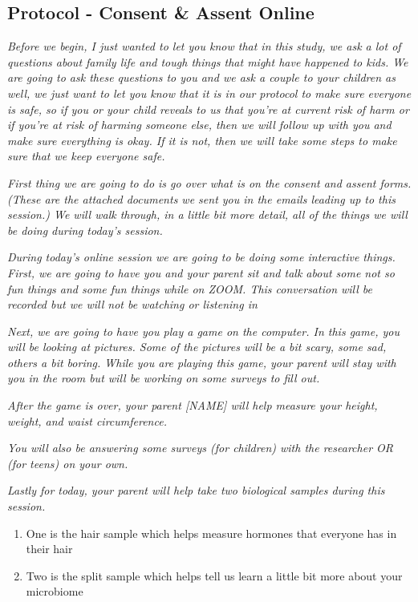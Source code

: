 \documentclass[]{book}
\begin{document}
\hypertarget{protocol---consent-assent-online-1}{%
\subsection{Protocol - Consent \& Assent Online}\label{protocol---consent-assent-online-1}}

\emph{Before we begin, I just wanted to let you know that in this study, we ask a lot of questions about family life and tough things that might have happened to kids. We are going to ask these questions to you and we ask a couple to your children as well, we just want to let you know that it is in our protocol to make sure everyone is safe, so if you or your child reveals to us that you're at current risk of harm or if you're at risk of harming someone else, then we will follow up with you and make sure everything is okay. If it is not, then we will take some steps to make sure that we keep everyone safe.}

\emph{First thing we are going to do is go over what is on the consent and assent forms. (These are the attached documents we sent you in the emails leading up to this session.) We will walk through, in a little bit more detail, all of the things we will be doing during today's session.}

\emph{During today's online session we are going to be doing some interactive things. First, we are going to have you and your parent sit and talk about some not so fun things and some fun things while on ZOOM. This conversation will be recorded but we will not be watching or listening in}

\emph{Next, we are going to have you play a game on the computer. In this game, you will be looking at pictures. Some of the pictures will be a bit scary, some sad, others a bit boring. While you are playing this game, your parent will stay with you in the room but will be working on some surveys to fill out.}

\emph{After the game is over, your parent {[}NAME{]} will help measure your height, weight, and waist circumference.}

\emph{You will also be answering some surveys (for children) with the researcher OR (for teens) on your own.}

\emph{Lastly for today, your parent will help take two biological samples during this session.}

\begin{enumerate}
\def\labelenumi{\arabic{enumi}.}
\item
  One is the hair sample which helps measure hormones that everyone has in their hair
\item
  Two is the split sample which helps tell us learn a little bit more about your microbiome
\end{enumerate}
\end{document}
